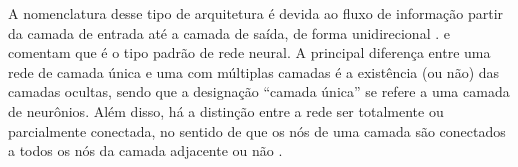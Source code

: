 \documentclass{automatextcc}
\begin{document}





A nomenclatura desse tipo de arquitetura é devida ao fluxo de informação partir da camada de entrada até a camada de saída, de forma unidirecional \citep{goodfellow2016}. \citet{hastie2009} e \citet{fan2021} comentam que é o tipo padrão de rede neural. A principal diferença entre uma rede de camada única e uma com múltiplas camadas é a existência (ou não) das camadas ocultas, sendo que a designação ``camada única'' se refere a uma camada de neurônios. Além disso, há a distinção entre a rede ser totalmente ou parcialmente conectada, no sentido de que os nós de uma camada são conectados a todos os nós da camada adjacente ou não \citep{haykin2009}. 
\end{document}
